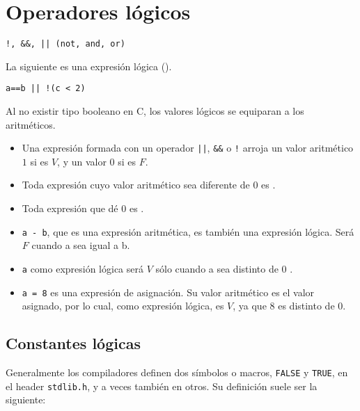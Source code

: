 \section{Operadores lógicos}
\begin{lstlisting}
!, &&, || (not, and, or)	
\end{lstlisting}

\begin{ejemplo}
La siguiente es una expresión lógica ().
\begin{lstlisting}
a==b || !(c < 2)    
\end{lstlisting}
\end{ejemplo}

Al no existir tipo booleano en C, los valores lógicos se equiparan a los aritméticos. 
\begin{itemize}
	\item Una expresión formada con un operador \lstinline{||}, \lstinline{&&} o \lstinline{!} arroja un valor aritmético $1$ si es $V$, y un valor $0$ si es $F$. 
	\item Toda expresión cuyo valor aritmético sea diferente de $0$ es . 
	\item Toda expresión que dé $0$ es .
\end{itemize}

\begin{ejemplo}
\noindent
\begin{itemize}
\item \lstinline{a - b}, que es una expresión aritmética, es también una expresión lógica. Será $F$ cuando a sea igual a b.
\item \lstinline{a} como expresión lógica será $V$ sólo cuando a sea distinto de 0 .

\item \lstinline{a = 8} es una expresión de asignación. Su valor aritmético es el valor asignado, por lo cual, como expresión lógica, es $V$, ya que 8 es distinto de 0.

\end{itemize}
\end{ejemplo}

\subsection{Constantes lógicas}
Generalmente los compiladores definen dos símbolos o macros, \lstinline{FALSE} y \lstinline{TRUE}, en el header \lstinline{stdlib.h}, y a veces también en otros. Su definición suele ser la siguiente:

